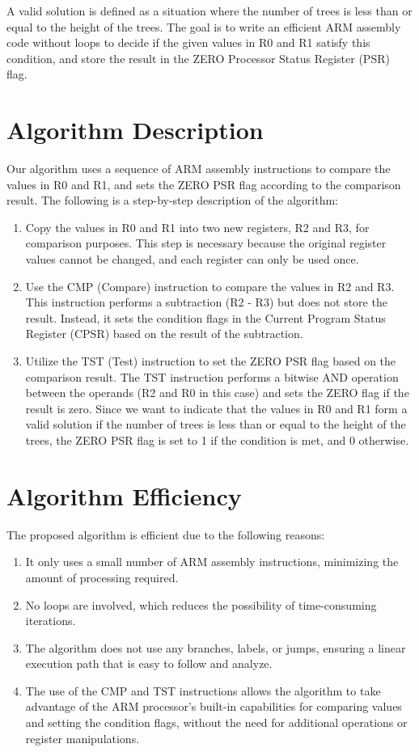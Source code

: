 A valid solution is defined as a situation where the number of trees is less than or equal to the height of the trees. The goal is to write an efficient ARM assembly code without loops to decide if the given values in R0 and R1 satisfy this condition, and store the result in the ZERO Processor Status Register (PSR) flag.

\section{Algorithm Description}
Our algorithm uses a sequence of ARM assembly instructions to compare the values in R0 and R1, and sets the ZERO PSR flag according to the comparison result. The following is a step-by-step description of the algorithm:

\begin{enumerate}
    \item Copy the values in R0 and R1 into two new registers, R2 and R3, for comparison purposes. This step is necessary because the original register values cannot be changed, and each register can only be used once.
    \item Use the CMP (Compare) instruction to compare the values in R2 and R3. This instruction performs a subtraction (R2 - R3) but does not store the result. Instead, it sets the condition flags in the Current Program Status Register (CPSR) based on the result of the subtraction.
    \item Utilize the TST (Test) instruction to set the ZERO PSR flag based on the comparison result. The TST instruction performs a bitwise AND operation between the operands (R2 and R0 in this case) and sets the ZERO flag if the result is zero. Since we want to indicate that the values in R0 and R1 form a valid solution if the number of trees is less than or equal to the height of the trees, the ZERO PSR flag is set to 1 if the condition is met, and 0 otherwise.
\end{enumerate}

\section{Algorithm Efficiency}
The proposed algorithm is efficient due to the following reasons:

\begin{enumerate}
    \item It only uses a small number of ARM assembly instructions, minimizing the amount of processing required.
    \item No loops are involved, which reduces the possibility of time-consuming iterations.
    \item The algorithm does not use any branches, labels, or jumps, ensuring a linear execution path that is easy to follow and analyze.
    \item The use of the CMP and TST instructions allows the algorithm to take advantage of the ARM processor's built-in capabilities for comparing values and setting the condition flags, without the need for additional operations or register manipulations.
\end{enumerate}

